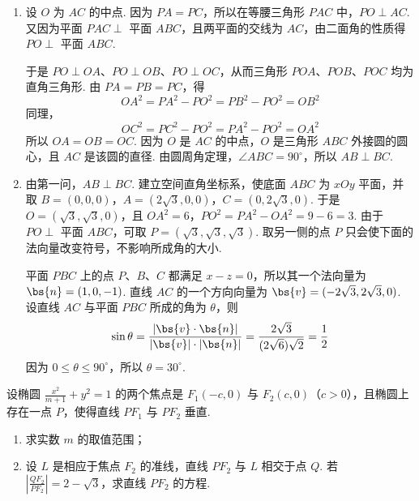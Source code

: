 \begin{solution}
\begin{enumerate}
\item 设 \(O\) 为 \(AC\) 的中点. 因为 \(PA=PC\)，所以在等腰三角形 \(PAC\) 中，\(PO\perp AC\). 又因为平面 \(PAC\perp\) 平面 \(ABC\)，且两平面的交线为 \(AC\)，由二面角的性质得 \(PO\perp\) 平面 \(ABC\).

于是 \(PO\perp OA\)、\(PO\perp OB\)、\(PO\perp OC\)，从而三角形 \(POA\)、\(POB\)、\(POC\) 均为直角三角形. 由 \(PA=PB=PC\)，得
\[
OA^2=PA^2-PO^2=PB^2-PO^2=OB^2
\]
同理，
\[
OC^2=PC^2-PO^2=PA^2-PO^2=OA^2
\]
所以 \(OA=OB=OC\). 因为 \(O\) 是 \(AC\) 的中点，\(O\) 是三角形 \(ABC\) 外接圆的圆心，且 \(AC\) 是该圆的直径. 由圆周角定理，\(\angle ABC=90^\circ\)，所以 \(AB\perp BC\).

\item 由第一问，\(AB\perp BC\). 建立空间直角坐标系，使底面 \(ABC\) 为 \(xOy\) 平面，并取
\(B=(0,0,0)\)，\(A=(2\sqrt3,0,0)\)，\(C=(0,2\sqrt3,0)\).
于是 \(O=(\sqrt3,\sqrt3,0)\)，且
\(OA^2=6\)，\(PO^2=PA^2-OA^2=9-6=3\).
由于 \(PO\perp\) 平面 \(ABC\)，可取 \(P=(\sqrt3,\sqrt3,\sqrt3)\). 取另一侧的点 \(P\) 只会使下面的法向量改变符号，不影响所成角的大小.

平面 \(PBC\) 上的点 \(P\)、\(B\)、\(C\) 都满足 \(x-z=0\)，所以其一个法向量为 \(\bs{n}=(1,0,-1)\). 直线 \(AC\) 的一个方向向量为 \(\bs{v}=(-2\sqrt3,2\sqrt3,0)\). 设直线 \(AC\) 与平面 \(PBC\) 所成的角为 \(\theta\)，则
\[
\sin\theta
=\frac{|\bs{v}\cdot\bs{n}|}{|\bs{v}|\cdot|\bs{n}|}
=\frac{2\sqrt3}{(2\sqrt6)\sqrt2}
=\frac12
\]
因为 \(0\leqslant\theta\leqslant90^\circ\)，所以 \(\theta=30^\circ\).
\end{enumerate}
\end{solution}

\begin{problem}
设椭圆 \(\frac{x^2}{m+1} + y^2 = 1\) 的两个焦点是 \(F_{1}(-c,0)\) 与 \(F_{2}(c,0)\)（\(c > 0\)），且椭圆上存在一点 \(P\)，使得直线 \(PF_{1}\) 与 \(PF_{2}\) 垂直.
\begin{enumerate}
\item 求实数 \(m\) 的取值范围；
\item 设 \(L\) 是相应于焦点 \(F_{2}\) 的准线，直线 \(PF_{2}\) 与 \(L\) 相交于点 \(Q\). 若 \(\left|\frac{QF_2}{PF_2}\right| = 2 - \sqrt{3}\)，求直线 \(PF_{2}\) 的方程.
\end{enumerate}
\end{problem}


